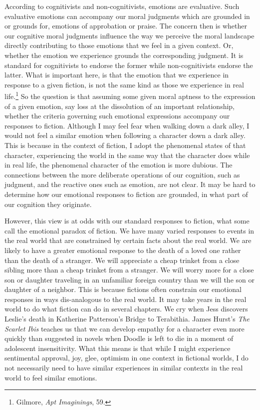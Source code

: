 \documentclass[
  12pt,
]{book}
\theoremstyle{definition}
\theoremstyle{definition}
\theoremstyle{definition}
\theoremstyle{definition}
\theoremstyle{remark}
\begin{document}
According to cognitivists and non-cognitivists, emotions are evaluative. Such evaluative emotions can accompany our moral judgments which are grounded in or grounds for, emotions of approbation or praise. The concern then is whether our cognitive moral judgments influence the way we perceive the moral landscape directly contributing to those emotions that we feel in a given context. Or, whether the emotion we experience grounds the corresponding judgment. It is standard for cognitivists to endorse the former while non-cognitivists endorse the latter. What is important here, is that the emotion that we experience in response to a given fiction, is not the same kind as those we experience in real life.\footnote{Gilmore, \emph{Apt {Imaginings}}, 59.} So the question is that assuming some given moral aptness to the expression of a given emotion, say loss at the dissolution of an important relationship, whether the criteria governing such emotional expressions accompany our responses to fiction. Although I may feel fear when walking down a dark alley, I would not feel a similar emotion when following a character down a dark alley. This is because in the context of fiction, I adopt the phenomenal states of that character, experiencing the world in the same way that the character does while in real life, the phenomenal character of the emotion is more dubious. The connections between the more deliberate operations of our cognition, such as judgment, and the reactive ones such as emotion, are not clear. It may be hard to determine how our emotional responses to fiction are grounded, in what part of our cognition they originate.

However, this view is at odds with our standard responses to fiction, what some call the emotional paradox of fiction. We have many varied responses to events in the real world that are constrained by certain facts about the real world. We are likely to have a greater emotional response to the death of a loved one rather than the death of a stranger. We will appreciate a cheap trinket from a close sibling more than a cheap trinket from a stranger. We will worry more for a close son or daughter traveling in an unfamiliar foreign country than we will the son or daughter of a neighbor. This is because fictions often constrain our emotional responses in ways dis-analogous to the real world. It may take years in the real world to do what fiction can do in several chapters. We cry when Jess discovers Leslie's death in Katherine Patterson's Bridge to Terabithia. James Hurst's \emph{The Scarlet Ibis} teaches us that we can develop empathy for a character even more quickly than suggested in novels when Doodle is left to die in a moment of adolescent insensitivity. What this means is that while I might experience sentimental approval, joy, glee, optimism in one context in fictional worlds, I do not necessarily need to have similar experiences in similar contexts in the real world to feel similar emotions.
\end{document}
